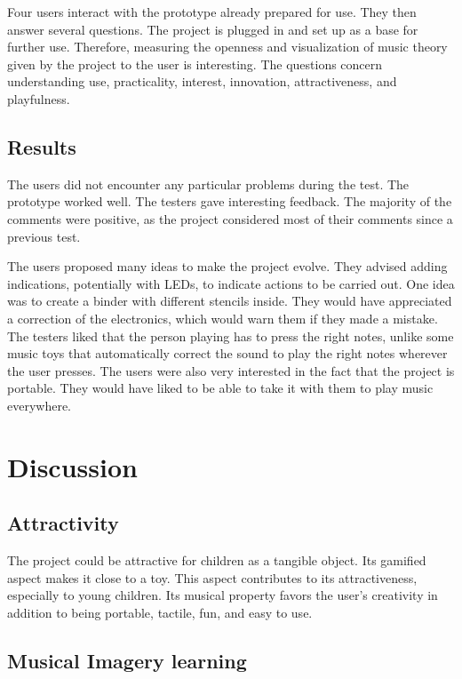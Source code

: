 Four users interact with the prototype already prepared for use. They then answer several questions. The project is plugged in and set up as a base for further use. Therefore, measuring the openness and visualization of music theory given by the project to the user is interesting. The questions concern understanding use, practicality, interest, innovation, attractiveness, and playfulness.

\subsection{Results}

The users did not encounter any particular problems during the test. The prototype worked well. The testers gave interesting feedback. The majority of the comments were positive, as the project considered most of their comments since a previous test.

The users proposed many ideas to make the project evolve. They advised adding indications, potentially with LEDs, to indicate actions to be carried out. One idea was to create a binder with different stencils inside. They would have appreciated a correction of the electronics, which would warn them if they made a mistake. The testers liked that the person playing has to press the right notes, unlike some music toys that automatically correct the sound to play the right notes wherever the user presses. The users were also very interested in the fact that the project is portable. They would have liked to be able to take it with them to play music everywhere.

\section{Discussion}

\subsection{Attractivity}

The project could be attractive for children as a tangible object.
Its gamified aspect makes it close to a toy. This aspect contributes to its attractiveness, especially to young children. Its musical property favors the user's creativity in addition to being portable, tactile, fun, and easy to use.

\subsection{Musical Imagery learning}

